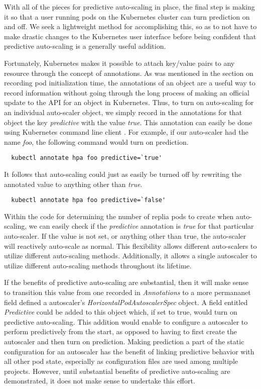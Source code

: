With all of the pieces for predictive auto-scaling in place, the final step is
making it so that a user running pods on the Kubernetes cluster can turn
prediction on and off. We seek a lightweight method for accomplishing this, so
as to not have to make drastic changes to the Kubernetes user interface before
being confident that predictive auto-scaling is a generally useful addition.

Fortunately, Kubernetes makes it possible to attach key/value pairs to any
resource through the concept of annotations. As was mentioned in the section on
recording pod initialization time, the annotations of an object are a useful way
to record information without going through the long process of making an
official update to the API for an object in Kubernetes. Thus, to turn on
auto-scaling for an individual auto-scaler object, we simply record in the annotations for
that object the key \textit{predictive} with the value \textit{true}. This
annotation can easily be done using Kubernetes command line
client \cite{k8s-kubectl-annotate}. For example,
if our auto-scaler had the name \textit{foo}, the following command would turn
on prediction.

\begin{verbatim}
  kubectl annotate hpa foo predictive=`true'
\end{verbatim}

It follows that auto-scaling could just as easily be turned off by rewriting the
annotated value to anything other than \textit{true}.

\begin{verbatim}
  kubectl annotate hpa foo predictive=`false'
\end{verbatim}

Within the code for determining the number of replia pods to create when
auto-scaling, we can easily check if the \textit{predictive} annotation is
\textit{true} for that particular auto-scaler. If the value is not set, or
anything other than true, the auto-scaler will reactively auto-scale as normal.
This flexibility allows different auto-scalers to utilize different auto-scaling
methods. Additionally, it allows a single autoscaler to utilize different
auto-scaling methods throughout its lifetime.

If the benefits of predictive auto-scaling are substantial, then it will make
sense to transition this value from one recorded in \textit{Annotations} to a
more permananet field defined a autoscaler's
\textit{HorizontalPodAutoscalerSpec} object. A field entitled
\textit{Predictive} could be added to this object which, if set to true, would
turn on predictive auto-scaling. This addition would enable to configure a
autoscaler to perform predictively from the start, as opposed to having to first
create the autoscaler and then turn on prediction. Making prediction a part of
the static configuration for an autoscaler has the benefit of linking predictive
behavior with all other pod state, especially as configuration files are used
among multiple projects. However, until substantial benefits of predictive
auto-scaling are demonstrated, it does not make sense to undertake this effort.
